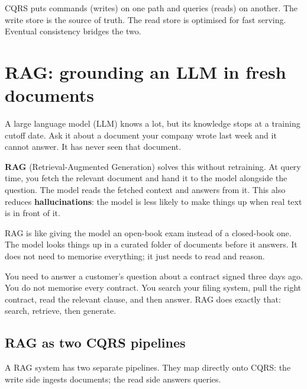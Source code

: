 \documentclass[a4paper,11pt]{article}
\newcommand{\vocab}[1]{\textbf{\color{navy}#1}}
\begin{document}
\begin{keytake}
CQRS puts commands (writes) on one path and queries (reads) on another.
The write store is the source of truth.
The read store is optimised for fast serving.
Eventual consistency bridges the two.
\end{keytake}

\section{RAG: grounding an LLM in fresh documents}

A large language model (LLM) knows a lot, but its knowledge stops at a training cutoff date.
Ask it about a document your company wrote last week and it cannot answer.
It has never seen that document.

\vocab{RAG} (Retrieval-Augmented Generation) solves this without retraining.
At query time, you fetch the relevant document and hand it to the model alongside the question.
The model reads the fetched context and answers from it.
This also reduces \vocab{hallucinations}: the model is less likely to make things up when
real text is in front of it.

\begin{intuition}
RAG is like giving the model an open-book exam instead of a closed-book one.
The model looks things up in a curated folder of documents before it answers.
It does not need to memorise everything; it just needs to read and reason.
\end{intuition}

\begin{everyday}
You need to answer a customer's question about a contract signed three days ago.
You do not memorise every contract.
You search your filing system, pull the right contract, read the relevant clause,
and then answer.
RAG does exactly that: search, retrieve, then generate.
\end{everyday}

\subsection{RAG as two CQRS pipelines}

A RAG system has two separate pipelines.
They map directly onto CQRS: the write side ingests documents; the read side answers queries.
\end{document}
